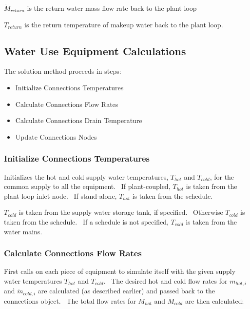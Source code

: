 \({\dot M_{return}}\) is the return water mass flow rate back to the plant loop

\({T_{return}}\) is the return temperature of makeup water back to the plant loop.

\subsection{Water Use Equipment Calculations}\label{water-use-equipment-calculations}

The solution method proceeds in steps:

\begin{itemize}
\item Initialize Connections Temperatures
\item Calculate Connections Flow Rates
\item Calculate Connections Drain Temperature
\item Update Connections Nodes
\end{itemize}

\subsubsection{Initialize Connections Temperatures}\label{initialize-connections-temperatures}

Initializes the hot and cold supply water temperatures, \({T_{hot}}\) and \({T_{cold}}\), for the common supply to all the equipment.~ If plant-coupled, \({T_{hot}}\) is taken from the plant loop inlet node.~ If stand-alone, \({T_{hot}}\) is taken from the schedule.

\({T_{cold}}\) is taken from the supply water storage tank, if specified.~ Otherwise \({T_{cold}}\) is taken from the schedule.~ If a schedule is not specified, \({T_{cold}}\) is taken from the water mains.

\subsubsection{Calculate Connections Flow Rates}\label{calculate-connections-flow-rates}

First calls on each piece of equipment to simulate itself with the given supply water temperatures \({T_{hot}}\) and \({T_{cold}}\).~ The desired hot and cold flow rates for \({\dot m_{hot,i}}\) and \({\dot m_{cold,i}}\) are calculated (as described earlier) and passed back to the connections object.~ The total flow rates for \({\dot M_{hot}}\) and \({\dot M_{cold}}\) are then calculated:

